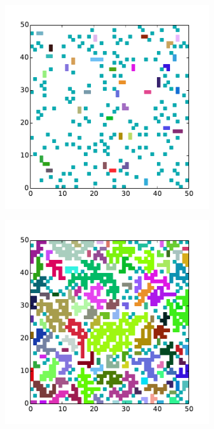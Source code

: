 \documentclass{scrartcl}
\begin{document}
\begin{figure}[H]
    \centering
    \begin{subfigure}{.31\textwidth}
        \centering
        \includegraphics[width=\textwidth]{plots/50-01.pdf}
    \end{subfigure}
    \begin{subfigure}{.31\textwidth}
        \centering
        \includegraphics[width=\textwidth]{plots/50-05.pdf}

\end{subfigure}
\end{figure}
\end{document}
